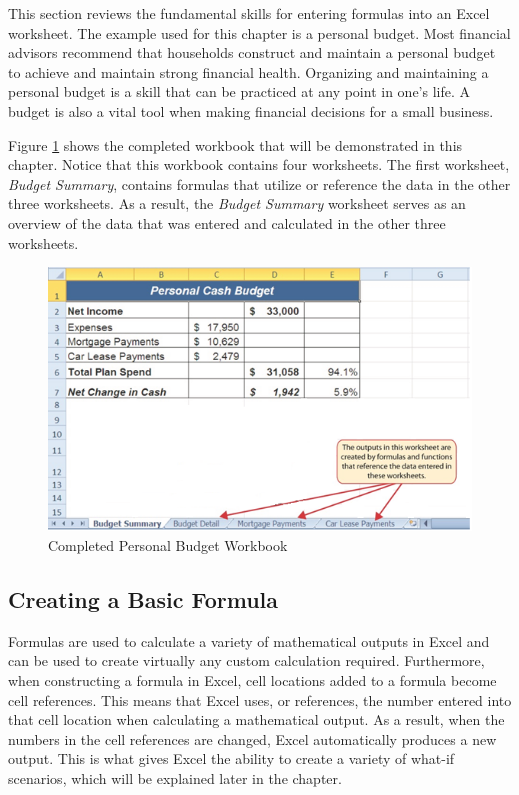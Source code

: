 This section reviews the fundamental skills for entering formulas into an Excel worksheet. The example used for this chapter is a personal budget. Most financial advisors recommend that households construct and maintain a personal budget to achieve and maintain strong financial health. Organizing and maintaining a personal budget is a skill that can be practiced at any point in one's life. A budget is also a vital tool when making financial decisions for a small business.

Figure \ref{02:fig01} shows the completed workbook that will be demonstrated in this chapter. Notice that this workbook contains four worksheets. The first worksheet, \textit{Budget Summary}, contains formulas that utilize or reference the data in the other three worksheets. As a result, the \textit{Budget Summary} worksheet serves as an overview of the data that was entered and calculated in the other three worksheets.

\begin{figure}[H]
	\centering
	\includegraphics[width=\maxwidth{.95\linewidth}]{gfx/ch02_fig01}
	\caption{Completed Personal Budget Workbook}
	\label{02:fig01}
\end{figure}

\subsection{Creating a Basic Formula}

Formulas are used to calculate a variety of mathematical outputs in Excel and can be used to create virtually any custom calculation required. Furthermore, when constructing a formula in Excel, cell locations added to a formula become cell references. This means that Excel uses, or references, the number entered into that cell location when calculating a mathematical output. As a result, when the numbers in the cell references are changed, Excel automatically produces a new output. This is what gives Excel the ability to create a variety of what-if scenarios, which will be explained later in the chapter.


